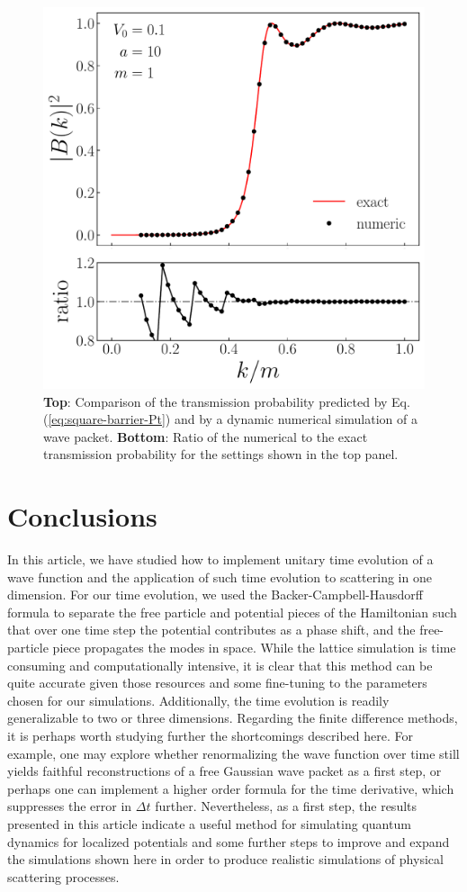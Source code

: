 \begin{figure}[tb]
    \centering
    \includegraphics[width=0.7\linewidth]{square_barrier.pdf}
    \caption{\textbf{Top}: Comparison of the transmission probability predicted by Eq. (\ref{eq:square-barrier-Pt}) and by a dynamic numerical simulation of a wave packet. \textbf{Bottom}: Ratio of the numerical to the exact transmission probability for the settings shown in the top panel.}
    \label{fig:square-barrier}
\end{figure}



\section{Conclusions}
\label{sec:conclusions}

In this article, we have studied how to implement unitary time evolution of a wave function and the application of such time evolution to scattering in one dimension.
For our time evolution, we used the Backer-Campbell-Hausdorff formula to separate the free particle and potential pieces of the Hamiltonian such that over one time step the potential contributes as a phase shift, and the free-particle piece propagates the modes in space.
While the lattice simulation is time consuming and computationally intensive, it is clear that this method can be quite accurate given those resources and some fine-tuning to the parameters chosen for our simulations.
Additionally, the time evolution is readily generalizable to two or three dimensions.
Regarding the finite difference methods, it is perhaps worth studying further the shortcomings described here.
For example, one may explore whether renormalizing the wave function over time still yields faithful reconstructions of a free Gaussian wave packet as a first step, or perhaps one can implement a higher order formula for the time derivative, which suppresses the error in $\Delta t$ further.
Nevertheless, as a first step, the results presented in this article indicate a useful method for simulating quantum dynamics for localized potentials and some further steps to improve and expand the simulations shown here in order to produce realistic simulations of physical scattering processes.


